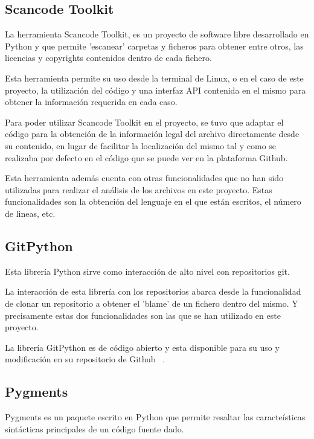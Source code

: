 \documentclass[a4paper, spanish, 12pt]{book}
\begin{document}
\subsection{Scancode Toolkit}
\label{subsec:scancode}

La herramienta Scancode Toolkit, es un proyecto de software libre desarrollado en
Python y que permite 'escanear' carpetas y ficheros para obtener entre otros, las
licencias y copyrights contenidos dentro de cada fichero.

Esta herramienta permite su uso desde la terminal de Linux, o en el caso de este proyecto,
la utilizaci\'on del c\'odigo y una interfaz API contenida en el mismo para obtener la
informaci\'on requerida en cada caso.

Para poder utilizar Scancode Toolkit en el proyecto, se tuvo que adaptar el c\'odigo
para la obtenci\'on de la informaci\'on legal del archivo directamente desde su contenido,
en lugar de facilitar la localizaci\'on del mismo tal y como se realizaba por defecto
en el c\'odigo que se puede ver en la plataforma Github. ~\cite{scancode}

Esta herramienta adem\'as cuenta con otras funcionalidades que no han sido utilizadas
para realizar el an\'alisis de los archivos en este proyecto. Estas funcionalidades
son la obtenci\'on del lenguaje en el que est\'an escritos, el n\'umero de lineas, etc.

\subsection{GitPython}
\label{subsec:gitpython}

Esta librer\'ia Python sirve como interacci\'on de alto nivel con repositorios git.

La interacci\'on de esta librer\'ia con los repositorios abarca desde la funcionalidad
de clonar un repositorio a obtener el 'blame' de un fichero dentro del mismo.
Y precisamente estas dos funcionalidades son las que se han utilizado en este proyecto.

La librer\'ia GitPython es de c\'odigo abierto y esta disponible para su uso y modificaci\'on
en su repositorio de Github ~\cite{gitpython}.

\subsection{Pygments}
\label{subsec:pygments}

Pygments es un paquete escrito en Python que permite resaltar las caracte\'isticas
sint\'acticas principales de un c\'odigo fuente dado.
\end{document}
